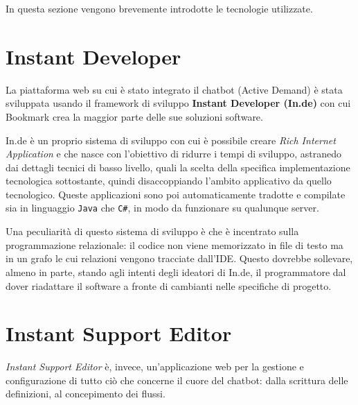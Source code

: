 In questa sezione vengono brevemente introdotte le tecnologie utilizzate.

\section{Instant Developer}
La piattaforma web su cui è stato integrato il chatbot (Active Demand) è stata sviluppata usando il framework di sviluppo \textbf{Instant Developer (In.de)} con cui Bookmark crea la maggior parte delle sue soluzioni software.

In.de è un proprio sistema di sviluppo con cui è possibile creare \textit{Rich Internet Application} e che nasce con l'obiettivo di ridurre i tempi di sviluppo, astranedo dai dettagli tecnici di basso livello, quali la scelta della specifica implementazione tecnologica sottostante, quindi disaccoppiando l'ambito applicativo da quello tecnologico.
%
Queste applicazioni sono poi automaticamente tradotte e compilate sia in linguaggio \texttt{Java} che \texttt{C\#}, in modo da funzionare su qualunque server. 

Una peculiarità di questo sistema di sviluppo è che è incentrato sulla programmazione relazionale: il codice non viene memorizzato in file di testo ma in un grafo le cui relazioni vengono tracciate dall'IDE. 
%
Questo dovrebbe sollevare, almeno in parte, stando agli intenti degli ideatori di In.de, il programmatore dal dover riadattare il software a fronte di cambianti nelle specifiche di progetto.

\section{Instant Support Editor}
\textit{Instant Support Editor} è, invece, un'applicazione web per la gestione e configurazione di tutto ciò che concerne il cuore del chatbot: dalla scrittura delle definizioni, al concepimento dei flussi.
